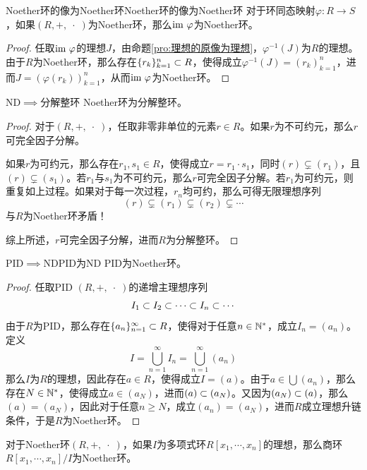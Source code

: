 \begin{proposition}{Noether环的像为Noether环}{Noether环的像为Noether环}
	对于环同态映射$\varphi:R\to S$，如果$(R,+,\;\cdot\;)$为Noether环，那么$\text{im } \varphi$为Noether环。
\end{proposition}

\begin{proof}
	任取$\text{im } \varphi$的理想$J$，由命题\ref{pro:理想的原像为理想}，$\varphi^{-1}(J)$为$R$的理想。由于$R$为Noether环，那么存在$\{ r_k \}_{k=1}^{n}\subset R$，使得成立$\varphi^{-1}(J)=(r_k)_{k=1}^{n}$，进而$J=(\varphi(r_k))_{k=1}^{n}$，从而$\text{im } \varphi$为Noether环。
\end{proof}

\begin{theorem}{ND$\implies$分解整环}
	Noether环为分解整环。
\end{theorem}

\begin{proof}
	对于$(R,+,\;\cdot\;)$，任取非零非单位的元素$r\in R$。如果$r$为不可约元，那么$r$可完全因子分解。
	
	如果$r$为可约元，那么存在$r_1,s_1\in R$，使得成立$r=r_1\cdot s_1$，同时$(r)\subsetneq (r_1)$，且$(r)\subsetneq (s_1)$。若$r_1$与$s_1$为不可约元，那么$r$可完全因子分解。若$r_1$为可约元，则重复如上过程。如果对于每一次过程，$r_n$均可约，那么可得无限理想序列
	$$
	(r)\subsetneq (r_1)\subsetneq (r_2) \subsetneq \cdots
	$$
	与$R$为Noether环矛盾！
	
	综上所述，$r$可完全因子分解，进而$R$为分解整环。
\end{proof}

\begin{theorem}{PID$\implies$ND}{PID为ND}
	PID为Noether环。
\end{theorem}

\begin{proof}
	任取PID $(R,+,\;\cdot\;)$的递增主理想序列
	$$
	I_1\subset I_2\subset \cdots \subset I_n\subset \cdots 
	$$
	由于$R$为PID，那么存在$\{a_n\}_{n=1}^{\infty}\subset R$，使得对于任意$n\in\mathbb{N}^*$，成立$I_n=(a_n)$。定义
	$$
	I=\bigcup_{n=1}^{\infty}I_n=\bigcup_{n=1}^{\infty}(a_n)
	$$
	那么$I$为$R$的理想，因此存在$a\in R$，使得成立$I=(a)$。由于$a\in \bigcup(a_n)$，那么存在$N\in\mathbb{N}^*$，使得成立$a\in (a_N)$，进而$(a)\subset (a_N)$。又因为$(a_N)\subset (a)$，那么$(a)=(a_N)$，因此对于任意$n\ge N$，成立$(a_n)=(a_N)$，进而$R$成立理想升链条件，于是$R$为Noether环。
\end{proof}

\begin{theorem}
	对于Noether环$(R,+,\;\cdot\;)$，如果$I$为多项式环$R[x_1,\cdots,x_n]$的理想，那么商环$R[x_1,\cdots,x_n]/I$为Noether环。
\end{theorem}

